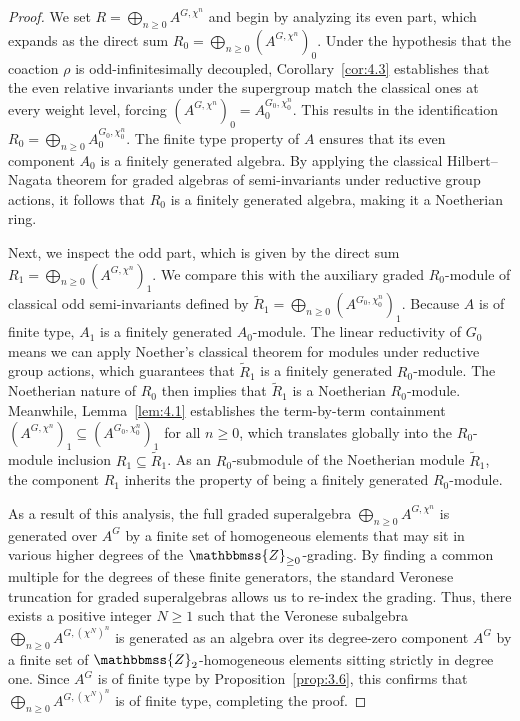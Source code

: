 \documentclass[11pt,a4paper,reqno,noamsfonts]{amsart}
\numberwithin{equation}{section}
\theoremstyle{definition}
\theoremstyle{remark}
\newcommand{\ZZ}{\ensuremath{\mathbbmss{Z}}}
\begin{document}
\begin{proof}
We set $R = \bigoplus_{n \geq 0} A^{G, \chi^n}$ and begin by analyzing its even part, which expands as the direct sum $R_0 = \bigoplus_{n \geq 0} (A^{G, \chi^n})_0$. Under the hypothesis that the coaction $\rho$ is odd-infinitesimally decoupled, Corollary~\ref{cor:4.3} establishes that the even relative invariants under the supergroup match the classical ones at every weight level, forcing $(A^{G,\chi^n})_0 = A_0^{G_0,\chi_0^n}$. This results in the identification $R_{0}=\bigoplus _{n\ge 0}A_{0}^{G_{0},\chi _{0}^{n}}$.  The finite type property of $A$ ensures that its even component $A_0$ is a finitely generated algebra. By applying the classical Hilbert--Nagata theorem for graded algebras of semi-invariants under reductive group actions, it follows that $R_0$ is a finitely generated algebra, making it a Noetherian ring.

Next, we inspect the odd part, which is given by the direct sum $R_1 = \bigoplus_{n \geq 0} (A^{G, \chi^n})_1$. We compare this with the auxiliary graded $R_0$-module of classical odd semi-invariants defined by $\tilde{R}_{1}=\bigoplus _{n\ge 0}(A^{G_{0},\chi _{0}^{n}})_{1}$. Because $A$ is of finite type, $A_1$ is a finitely generated $A_0$-module. The linear reductivity of $G_0$ means we can apply Noether’s classical theorem for modules under reductive group actions, which guarantees that $\tilde{R}_{1}$ is a finitely generated $R_0$-module. The Noetherian nature of $R_0$ then implies that $\tilde{R}_{1}$ is a Noetherian $R_0$-module. Meanwhile, Lemma~\ref{lem:4.1} establishes the term-by-term containment $(A^{G,\chi^n})_1 \subseteq (A^{G_0,\chi_0^n})_1$ for all $n \geq 0$, which translates globally into the $R_0$-module inclusion $R_{1}\subseteq \tilde{R}_{1}$. As an $R_0$-submodule of the Noetherian module $\tilde{R}_{1}$, the component $R_1$ inherits the property of being a finitely generated $R_0$-module. 

As a result of this analysis, the full graded superalgebra $\bigoplus_{n \geq 0} A^{G,\chi^n}$ is generated over $A^{G}$ by a finite set of homogeneous elements that may sit in various higher degrees of the $\ZZ_{\geq 0}$-grading. By finding a common multiple for the degrees of these finite generators, the standard Veronese truncation for graded superalgebras allows us to re-index the grading. Thus, there exists a positive integer $N \geq 1$ such that the Veronese subalgebra $\bigoplus_{n \geq 0} A^{G, (\chi^{N})^{n}}$ is generated as an algebra over its degree-zero component $A^{G}$ by a finite set of $\ZZ_{2}$-homogeneous elements sitting strictly in degree one. Since $A^{G}$ is of finite type by Proposition~\ref{prop:3.6}, this confirms that $\bigoplus_{n \geq 0} A^{G, (\chi^{N})^{n}}$ is of finite type, completing the proof.
\end{proof}
\end{document}
